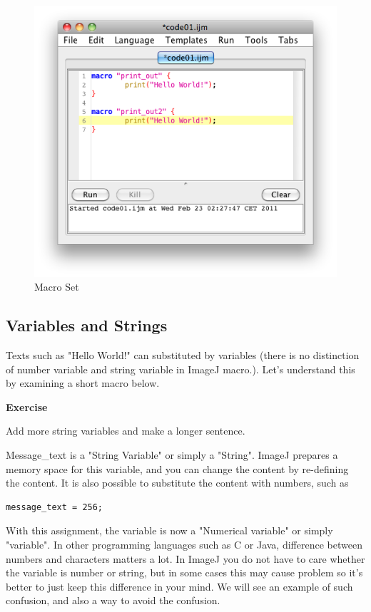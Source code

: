 \documentclass[11pt,a4paper,oneside]{report}
\newenvironment{indentexercise}[1]%
{{\setlength{\leftmargin}{2em}}%
\textbf{Exercise \thesubsection-#1}%
\begin{list}{}%
	\item%
}
{\end{list}}
\begin{document}
\begin{figure}[htbp]
\begin{center}
\includegraphics[scale=0.6]{fig/editor_MacroSet.png}
\caption{Macro Set} \label{fig_MacroSetInMenu}
\end{center}
\end{figure}

\subsection{Variables and Strings}
Texts such as "Hello World!" can substituted by variables 
(there is no distinction of number variable and string variable in ImageJ macro.). 
Let's understand this by examining a short macro below.



\begin{indentexercise}{1}
\item Add more string variables and make a longer sentence.\\
\end{indentexercise}

Message\_text is a "String Variable" or simply a "String". 
ImageJ prepares a memory space for this variable, and you can change the content by re-defining the content. 
It is also possible to substitute the content with numbers, such as\\
\begin{lstlisting}[numbers=none]
message_text = 256;
\end{lstlisting}
With this assignment, the variable is now a "Numerical variable" or simply "variable". 
In other programming languages such as C or Java, difference between numbers and characters matters a lot. 
In ImageJ you do not have to care whether the variable is number or string, 
but in some cases this may cause problem 
so it's better to just keep this difference in your mind. We will see an example of such confusion, 
and also a way to avoid the confusion. 
\end{document}
